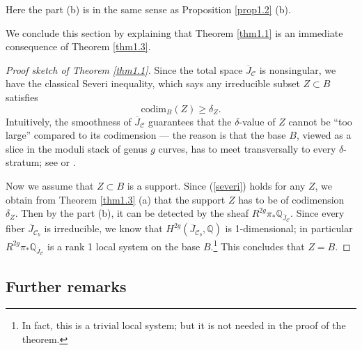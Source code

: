 \documentclass{pspum-l}
\theoremstyle{plain}
\theoremstyle{definition}
\theoremstyle{remark}
\newcommand{\BQ}{{\mathbb{Q}}}
\newcommand{\CC}{{\mathcal C}}
\begin{document}
Here the part (b) is in the same sense as Proposition \ref{prop1.2} (b).


We conclude this section by explaining that Theorem \ref{thm1.1} is an immediate consequence of Theorem \ref{thm1.3}.

\begin{proof}[Proof sketch of Theorem \ref{thm1.1}]
 Since the total space $\overline{J}_\CC$ is nonsingular, we have the classical Severi inequality, which says any irreducible subset $Z\subset B$ satisfies
 \begin{equation}\label{severi}
 \mathrm{codim}_B(Z) \geq \delta_Z.
 \end{equation}
Intuitively, the smoothness of $\overline{J}_\CC$ guarantees that the $\delta$-value of $Z$ cannot be ``too large'' compared to its codimension --- the reason is that the base $B$, viewed as a slice in the moduli stack of genus $g$ curves, has to meet transversally to every $\delta$-stratum; see \cite[Theorem 7.3]{CL} or \cite[Lemma 4.1]{MS_chi}.

Now we assume that $Z \subset B$ is a support. Since (\ref{severi}) holds for any $Z$, we obtain from Theorem \ref{thm1.3} (a) that the support $Z$ has to be of codimension $\delta_Z$. Then by the part (b), it can be detected by the sheaf $R^{2g}\pi_* \BQ_{\overline{J}_\CC}$. Since every fiber $\overline{J}_{\CC_b}$ is irreducible, we know that $H^{2g}(\overline{J}_{\CC_b}, \BQ)$ is 1-dimensional; in particular $R^{2g}\pi_* \BQ_{\overline{J}_\CC}$ is a rank 1 local system on the base $B$.\footnote{In fact, this is a trivial local system; but it is not needed in the proof of the theorem.} This concludes that $Z = B$.
\end{proof}



\subsection{Further remarks}
\end{document}
